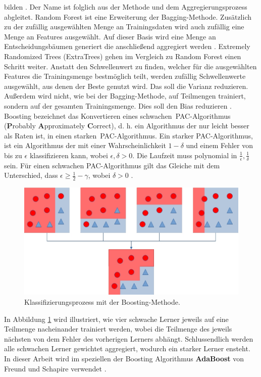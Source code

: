 bilden \cite{efron1992bootstrap}. Der Name ist folglich aus der Methode und dem Aggregierungsprozess abgleitet.
\newline
\newline
Random Forest ist eine Erweiterung der Bagging-Methode. Zusätzlich zu der zufällig ausgewählten Menge an Trainingsdaten wird auch zufällig eine Menge an Features ausgewählt. Auf dieser Basis wird eine Menge an
Entscheidungsbäumen generiert die anschließend aggregiert werden \cite{breiman2001random}.
\newline
\newline
Extremely Randomized Trees (ExtraTrees) gehen im Vergleich zu Random Forest einen Schritt weiter. Anstatt den Schwellenwert zu finden, welcher für die ausgewählten Features die Trainingsmenge bestmöglich teilt,
werden zufällig Schwellenwerte ausgewählt, aus denen der Beste genutzt wird. Das soll die Varianz reduzieren. Außerdem wird nicht, wie bei der Bagging-Methode, auf Teilmengen trainiert, sondern
auf der gesamten Trainingsmenge. Dies soll den Bias reduzieren \cite{geurts2006extremely}.
\newline
\newline
Boosting bezeichnet das Konvertieren eines \glqq schwachen\grqq\ PAC-Algorithmus (\textbf{P}robably \textbf{A}pproximately \textbf{C}orrect), d. h. ein Algorithmus der nur leicht besser als Raten ist,
in einen \glqq starken\grqq\ PAC-Algorithmus. Ein starker PAC-Algorithmus, ist ein Algorithmus der mit einer Wahrscheinlichkeit $1 - \delta$ und einem Fehler von bis zu $\epsilon$ klassifizieren kann, wobei $\epsilon, \delta > 0$. Die
Laufzeit muss polynomial in $\frac{1}{\epsilon}, \frac{1}{\delta}$ sein. Für einen schwachen PAC-Algorithmus gilt das Gleiche mit dem Unterschied, dass $\epsilon \geq \frac{1}{2} - \gamma$, wobei $\delta > 0$ \cite{freund1997decision}.
\begin{figure}
    \centering
    \includegraphics[width=\linewidth]{images/boosting.jpg}
    \caption{Klassifizierungsprozess mit der Boosting-Methode.}
    \label{fig:boosting}
\end{figure}
In Abbildung \ref{fig:boosting} wird illustriert, wie vier schwache Lerner jeweils auf eine Teilmenge nacheinander trainiert werden, wobei die Teilmenge des jeweils nächsten von dem Fehler des vorherigen Lerners
abhängt. Schlussendlich werden alle schwachen Lerner gewichtet aggregiert, wodurch ein starker Lerner ensteht. In dieser Arbeit wird im speziellen der Boosting Algorithmus \textbf{AdaBoost} von Freund
und Schapire verwendet \cite{freund1997decision}.